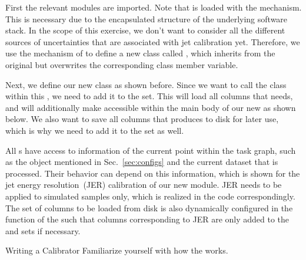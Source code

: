 First the relevant modules are imported.
Note that  is loaded with the  mechanism.
This is necessary due to the encapsulated structure of the underlying software stack.
In the scope of this exercise, we don't want to consider all the different sources of uncertainties that are associated with jet calibration yet.
Therefore, we use the  mechanism of  to define a new class called , which inherits from the original   but overwrites the corresponding class member variable.

Next, we define our new  class  as shown before.
Since we want to call the  class within this , we need to add it to the  set.
This will load all columns that  needs, and will additionally make  accessible within the main body of our new  as shown below.
We also want to save all columns that  produces to disk for later use, which is why we need to add it to the  set as well.

All s have access to information of the current point within the task graph, such as the  object mentioned in Sec.~\ref{sec:configs} and the current dataset that is processed.
Their behavior can depend on this information, which is shown for the jet energy resolution~(JER) calibration of our new  module.
JER needs to be applied to simulated samples only, which is realized in the code correspondingly.
The set of columns to be loaded from disk is also dynamically configured in the  function of the   such that columns corresponding to JER are only added to the  and  sets if necessary.

\begin{exercise}{Writing a Calibrator}%
	Familiarize yourself with how the   works.
\end{exercise}
